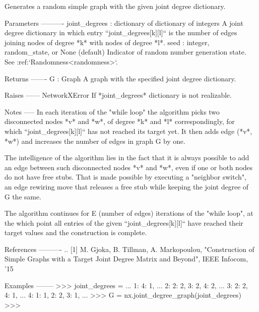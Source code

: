 \begin{DoxyVerb}Generates a random simple graph with the given joint degree dictionary.

Parameters
----------
joint_degrees :  dictionary of dictionary of integers
    A joint degree dictionary in which entry ``joint_degrees[k][l]`` is the
    number of edges joining nodes of degree *k* with nodes of degree *l*.
seed : integer, random_state, or None (default)
    Indicator of random number generation state.
    See :ref:`Randomness<randomness>`.

Returns
-------
G : Graph
    A graph with the specified joint degree dictionary.

Raises
------
NetworkXError
    If *joint_degrees* dictionary is not realizable.

Notes
-----
In each iteration of the "while loop" the algorithm picks two disconnected
nodes *v* and *w*, of degree *k* and *l* correspondingly,  for which
``joint_degrees[k][l]`` has not reached its target yet. It then adds
edge (*v*, *w*) and increases the number of edges in graph G by one.

The intelligence of the algorithm lies in the fact that  it is always
possible to add an edge between such disconnected nodes *v* and *w*,
even if one or both nodes do not have free stubs. That is made possible by
executing a "neighbor switch", an edge rewiring move that releases
a free stub while keeping the joint degree of G the same.

The algorithm continues for E (number of edges) iterations of
the "while loop", at the which point all entries of the given
``joint_degrees[k][l]`` have reached their target values and the
construction is complete.

References
----------
..  [1] M. Gjoka, B. Tillman, A. Markopoulou, "Construction of Simple
    Graphs with a Target Joint Degree Matrix and Beyond", IEEE Infocom, '15

Examples
--------
>>> joint_degrees = {
...     1: {4: 1},
...     2: {2: 2, 3: 2, 4: 2},
...     3: {2: 2, 4: 1},
...     4: {1: 1, 2: 2, 3: 1},
... }
>>> G = nx.joint_degree_graph(joint_degrees)
>>>
\end{DoxyVerb}
 